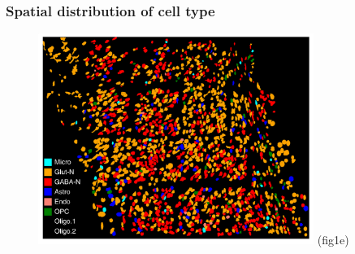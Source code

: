 \documentclass{beamer}
\begin{document}
  \begin{frame}
  \frametitle{Spatial distribution of cell type}
  \begin{figure}
    \centering
    \includegraphics[width=0.8\textwidth]{cell_type} (fig1e)
  \end{figure}
  \end{frame}
\end{document}
